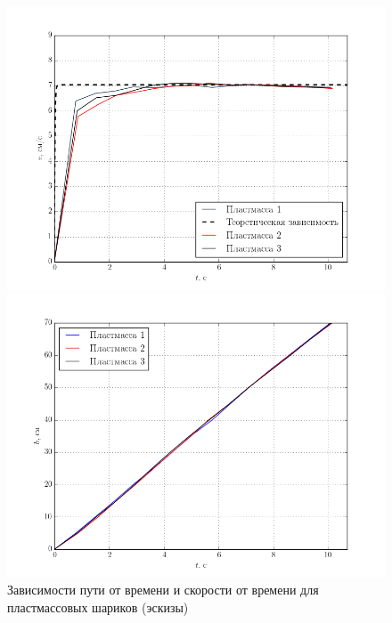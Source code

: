 \documentclass[a4paper,12pt]{article}
\begin{document}
\begin{figure}[H]
		\begin{minipage}[c]{0.49\textwidth}
			\includegraphics[width=1\textwidth]{img/plastic123.png}
		\end{minipage}	
		\begin{minipage}[c]{0.49\textwidth}
			\centering
			\includegraphics[width=1\textwidth]{img/plastic123-s.png}
		\end{minipage}		
	\caption{Зависимости пути от времени и скорости от времени для пластмассовых шариков (эскизы)}
	\label{fig:figure1}
\end{figure}
\end{document}
